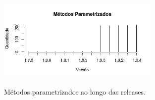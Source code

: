 	
	\begin{figure}[h]
		\center
		\includegraphics[width=0.7\textwidth]{Imagens/metodosParametrizados.png}
		\label{fig:metodosParametrizadosAnt}
		\caption{Métodos parametrizados ao longo das releases.}
	\end{figure}